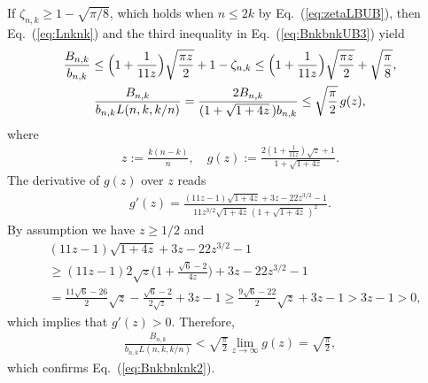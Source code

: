 \documentclass[aop]{imsart}
\theoremstyle{plain}
\theoremstyle{remark}
\newcommand{\1}{\operatorname{\uppercase\expandafter{\romannumeral1}}}
\newcommand{\2}{\operatorname{\uppercase\expandafter{\romannumeral2}}}
\newcommand{\3}{\operatorname{\uppercase\expandafter{\romannumeral3}}}
\newcommand{\4}{\operatorname{\uppercase\expandafter{\romannumeral4}}}
\newcommand{\5}{\operatorname{\uppercase\expandafter{\romannumeral5}}}
\newcommand{\6}{\operatorname{\uppercase\expandafter{\romannumeral6}}}
\newcommand{\7}{\operatorname{\uppercase\expandafter{\romannumeral7}}}
\newcommand{\8}{\operatorname{\uppercase\expandafter{\romannumeral8}}}
\newcommand{\9}{\operatorname{\uppercase\expandafter{\romannumeral9}}}
\newcommand{\eref}[1]{Eq.~\textup{(\ref{#1})}}
\begin{document}
\begin{appendix}
	
		If $\zeta_{n,k}\geq 1-\sqrt{\pi/8}$, which holds when $n\leq 2k$ by \eref{eq:zetaLBUB}, then  \eref{eq:Lnknk} and the third inequality in \eref{eq:BnkbnkUB3} yield
	\begin{gather}
	\frac{B_{n,k}}{b_{n,k}}
	\leq \Bigl(1+\frac{1}{11z}\Bigr)\sqrt{\frac{\pi z}{2}}+1-\zeta_{n,k}\leq 
	 \Bigl(1+\frac{1}{11z}\Bigr)\sqrt{\frac{\pi z}{2}}+\sqrt{\frac{\pi}{8}},\\	
	\frac{B_{n,k}}{ b_{n,k}L(n,k,k/n)}=\frac{2B_{n,k}}{(1+\sqrt{1+4z}\,) b_{n,k}}\leq \sqrt{\frac{\pi}{2}}\,g(z),
	\end{gather}
	where 
	\begin{align}
	z:=\frac{k(n-k)}{n},\quad g(z):=\frac{2(1+\frac{1}{11z})\sqrt{z} +1}{1+\sqrt{1+4z}}.\label{eq:xgx}
	\end{align}
	The derivative of $g(z)$ over $z$ reads
	\begin{align}
	g'(z)=\frac{(11 z-1)\sqrt{1+4z}+3z-22z^{3/2}-1}{11z^{3/2}\sqrt{1+4z}\,(1+\sqrt{1+4z}\,)^2}.
	\end{align}
	By assumption we have $z\geq 1/2$ and 
	\begin{align}
	&(11 z-1)\sqrt{1+4z}+3z-22z^{3/2}-1\\
	&\geq (11 z-1)2\sqrt{z}\biggl(1+\frac{\sqrt{6}-2}{4z}\biggr)+3z-22z^{3/2}-1 \nonumber
\\
	&=\frac{11\sqrt{6}-26}{2}\sqrt{z}-\frac{\sqrt{6}-2}{2\sqrt{z}}+3z-1
	\geq  \frac{9\sqrt{6}-22}{2}\sqrt{z}+3z-1> 3z-1> 0,\nonumber
	\end{align}
which implies that  $g'(z)> 0$. Therefore,
	\begin{align}
	\frac{B_{n,k}}{b_{n,k}L(n,k,k/n)}< \sqrt{\frac{\pi}{2}}\lim_{z\to\infty} g(z)=\sqrt{\frac{\pi}{2}},
	\end{align}
	which confirms \eref{eq:Bnkbnknk2}. \\
	




\end{appendix}
\end{document}
